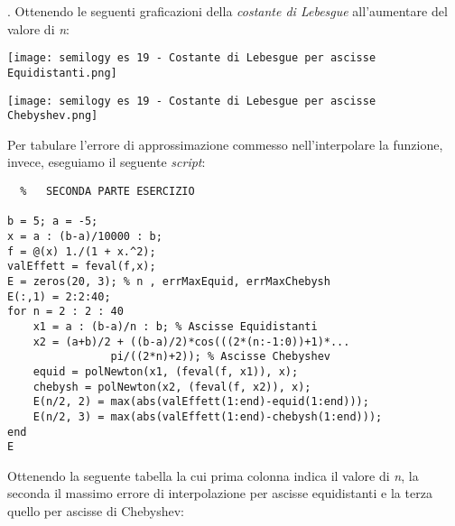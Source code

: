 \documentclass[a4paper]{report}
\begin{document}
.\newpage
Ottenendo le seguenti graficazioni della \emph{costante di Lebesgue} all'aumentare del valore di \emph{n}:\\
\begin{center}	%
	\texttt{[image: semilogy es 19 - Costante di Lebesgue per ascisse Equidistanti.png]}
\end{center}
\begin{center}	%
	\texttt{[image: semilogy es 19 - Costante di Lebesgue per ascisse Chebyshev.png]}
\end{center}
\newpage
Per tabulare l'errore di approssimazione  commesso  nell'interpolare la funzione, invece, eseguiamo il seguente \emph{script}:\\
\begin{lstlisting}	%	SECONDA PARTE ESERCIZIO

b = 5; a = -5;
x = a : (b-a)/10000 : b;
f = @(x) 1./(1 + x.^2);
valEffett = feval(f,x);
E = zeros(20, 3); % n , errMaxEquid, errMaxChebysh
E(:,1) = 2:2:40; 
for n = 2 : 2 : 40
	x1 = a : (b-a)/n : b; % Ascisse Equidistanti
	x2 = (a+b)/2 + ((b-a)/2)*cos(((2*(n:-1:0))+1)*...
				pi/((2*n)+2)); % Ascisse Chebyshev
	equid = polNewton(x1, (feval(f, x1)), x);
	chebysh = polNewton(x2, (feval(f, x2)), x);
	E(n/2, 2) = max(abs(valEffett(1:end)-equid(1:end)));
	E(n/2, 3) = max(abs(valEffett(1:end)-chebysh(1:end)));
end
E
\end{lstlisting}
Ottenendo la seguente tabella la cui prima colonna indica il valore di \emph{n}, la seconda il massimo errore di interpolazione per ascisse equidistanti e la terza quello per ascisse di Chebyshev:\\ \\
\end{document}
